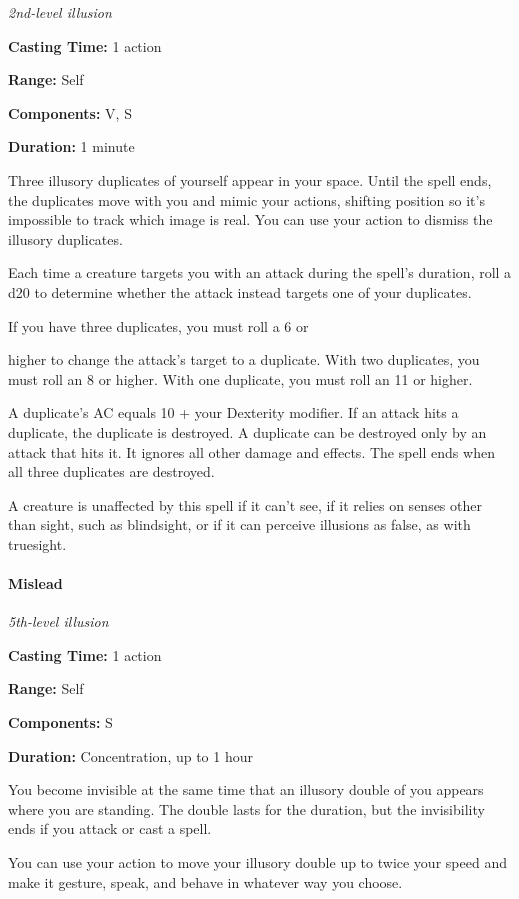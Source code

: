 \documentclass[
]{article}
\begin{document}
\emph{2nd-level illusion}

\textbf{Casting Time:} 1 action

\textbf{Range:} Self

\textbf{Components:} V, S

\textbf{Duration:} 1 minute

Three illusory duplicates of yourself appear in your space. Until the
spell ends, the duplicates move with you and mimic your actions,
shifting position so it's impossible to track which image is real. You
can use your action to dismiss the illusory duplicates.

Each time a creature targets you with an attack during the spell's
duration, roll a d20 to determine whether the attack instead targets one
of your duplicates.

If you have three duplicates, you must roll a 6 or

higher to change the attack's target to a duplicate. With two
duplicates, you must roll an 8 or higher. With one duplicate, you must
roll an 11 or higher.

A duplicate's AC equals 10 + your Dexterity modifier. If an attack hits
a duplicate, the duplicate is destroyed. A duplicate can be destroyed
only by an attack that hits it. It ignores all other damage and effects.
The spell ends when all three duplicates are destroyed.

A creature is unaffected by this spell if it can't see, if it relies on
senses other than sight, such as blindsight, or if it can perceive
illusions as false, as with truesight.

\hypertarget{mislead}{%
\paragraph{Mislead}\label{mislead}}

\emph{5th-level illusion}

\textbf{Casting Time:} 1 action

\textbf{Range:} Self

\textbf{Components:} S

\textbf{Duration:} Concentration, up to 1 hour

You become invisible at the same time that an illusory double of you
appears where you are standing. The double lasts for the duration, but
the invisibility ends if you attack or cast a spell.

You can use your action to move your illusory double up to twice your
speed and make it gesture, speak, and behave in whatever way you choose.
\end{document}
